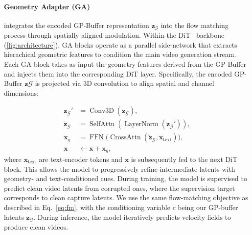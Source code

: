 \paragraph{Geometry Adapter (GA)} integrates the encoded GP-Buffer representation $\mathbf{z}_{\mathcal{G}}$ into the flow matching process through spatially aligned modulation. 
Within the DiT~\cite{peebles2023scalable} backbone (\cf\cref{fig:architecture}), GA blocks operate as a parallel side-network that extracts hierachical geometric features to condition the main video generation stream. Each GA block takes as input the geometry features derived from the GP-Buffer and injects them into the corresponding DiT layer.
Specifically, the encoded GP-Buffer $\mathbf{z}{\mathcal{G}}$ is projected via 3D convolution to align spatial and channel dimensions:

\begin{align}
\mathbf{z}_{\mathcal{G}}' &= \operatorname{Conv3D}(\mathbf{z}_{\mathcal{G}}), \nonumber \\
\tilde{\mathbf{z}}_{\mathcal{G}} &= 
\operatorname{SelfAttn}(\operatorname{LayerNorm}(\mathbf{z}_{\mathcal{G}}')), \nonumber \\
\mathbf{x}_g &= 
\operatorname{FFN}\!\Big(
\operatorname{CrossAttn}(\tilde{\mathbf{z}}_{\mathcal{G}}, \mathbf{x}_{\text{text}})
\Big), \nonumber\\
\mathbf{x} &\leftarrow \mathbf{x} + \mathbf{x}_g, \nonumber
\label{eq:ga_block}
\end{align}
where $\mathbf{x}_{\text{text}}$ are text-encoder tokens and $\mathbf{x}$ is subsequently fed to the next DiT block.
This allows the model to progressively refine intermediate latents with geometry- and text-conditioned cues.
During training, the model is supervised to predict clean video latents from corrupted ones, where the supervision target corresponds to clean capture latents. 
We use the same flow-matching objective as described in Eq.~\ref{eq:fm}, with the conditioning variable $c$ being our GP-buffer latents $\mathbf{z}_{\mathcal{G}}$.
During inference, the model iteratively predicts velocity fields to produce clean videos.


